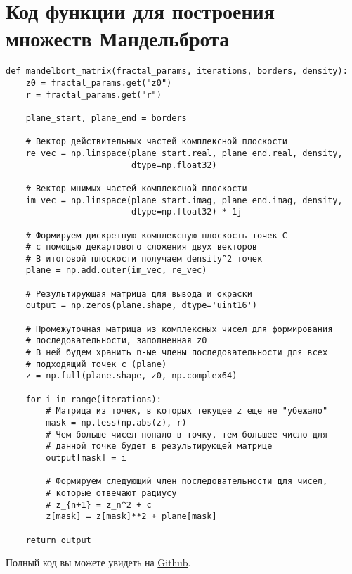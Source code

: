 \documentclass[a4paper,12pt]{article}
\begin{document}
\clearpage

\hypertarget{sec:4}{}
\section{\textbf{Код функции для построения множеств Мандельброта}}

\begin{lstlisting}[caption={Функция для построения множества Мандельброта}, label={lst:mandelbrot}]
def mandelbort_matrix(fractal_params, iterations, borders, density):
    z0 = fractal_params.get("z0") 
    r = fractal_params.get("r")
    
    plane_start, plane_end = borders
    
    # Вектор действительных частей комплексной плоскости
    re_vec = np.linspace(plane_start.real, plane_end.real, density,
                         dtype=np.float32)
    
    # Вектор мнимых частей комплексной плоскости
    im_vec = np.linspace(plane_start.imag, plane_end.imag, density,
                         dtype=np.float32) * 1j
                         
    # Формируем дискретную комплексную плоскость точек С
    # с помощью декартового сложения двух векторов
    # В итоговой плоскости получаем density^2 точек
    plane = np.add.outer(im_vec, re_vec)
    
    # Результирующая матрица для вывода и окраски
    output = np.zeros(plane.shape, dtype='uint16')
    
    # Промежуточная матрица из комплексных чисел для формирования
    # последовательности, заполненная z0
    # В ней будем хранить n-ые члены последовательности для всех
    # подходящий точек c (plane)
    z = np.full(plane.shape, z0, np.complex64) 
    
    for i in range(iterations):
        # Матрица из точек, в которых текущее z еще не "убежало"
        mask = np.less(np.abs(z), r)
        # Чем больше чисел попало в точку, тем большее число для
        # данной точке будет в результирующей матрице
        output[mask] = i
        
        # Формируем следующий член последовательности для чисел,
        # которые отвечают радиусу
        # z_{n+1} = z_n^2 + c
        z[mask] = z[mask]**2 + plane[mask]
        
    return output
\end{lstlisting}
Полный код вы можете увидеть на \href{https://github.com/Axe-On-You/tfkp-lab1}{Github}.
\end{document}
